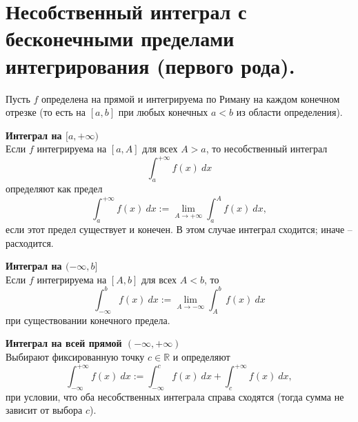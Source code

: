 \documentclass[14pt]{extreport}
\begin{document}
    \chapter{Несобственный интеграл с бесконечными пределами интегрирования (первого рода).}

    Пусть $f$ определена на прямой и интегрируема по Риману на каждом конечном отрезке (то есть на $[a,b]$ при любых конечных $a<b$ из области определения).

    \begin{definition}
        \textbf{Интеграл на $[a,+\infty)$}\\
        Если $f$ интегрируема на $[a,A]$ для всех $A>a$, то несобственный интеграл
        \[
        \int_a^{+\infty} f(x)\ dx
        \]
        определяют как предел
        \[
        \int_a^{+\infty} f(x)\ dx := \lim_{A \rightarrow +\infty} \int_a^A f(x)\ dx,
        \]
        если этот предел существует и конечен. В этом случае интеграл сходится; иначе – расходится.
    \end{definition}

    \begin{definition}
        \textbf{Интеграл на $(-\infty,b]$}\\
        Если $f$ интегрируема на $[A,b]$ для всех $A<b$, то
        \[
        \int_{-\infty}^b f(x)\ dx := \lim_{A \rightarrow -\infty} \int_A^b f(x)\ dx
        \]
        при существовании конечного предела.
    \end{definition}

    \begin{definition}
        \textbf{Интеграл на всей прямой $(-\infty,+\infty)$}\\
        Выбирают фиксированную точку $c \in \mathbb{R}$ и определяют
        \[
        \int_{-\infty}^{+\infty} f(x)\ dx := \int_{-\infty}^c f(x)\ dx + \int_c^{+\infty} f(x)\ dx,
        \]
        при условии, что оба несобственных интеграла справа сходятся (тогда сумма не зависит от выбора $c$).
    \end{definition}
\end{document}
